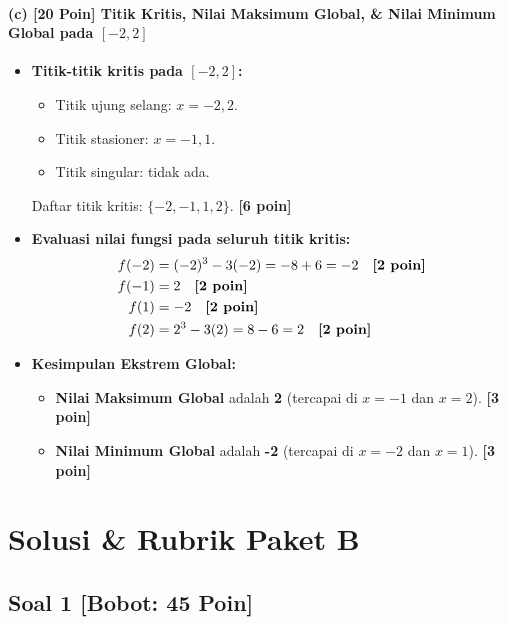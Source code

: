 \documentclass[11pt,a4paper]{article}
\begin{document}
\paragraph{(c) [20 Poin] Titik Kritis, Nilai Maksimum Global, \& Nilai Minimum Global pada $[-2, 2]$}
\begin{itemize}[leftmargin=18pt]
    \item \textbf{Titik-titik kritis pada $[-2, 2]$:}
    \begin{itemize}
        \item Titik ujung selang: $x = -2, 2$.
        \item Titik stasioner: $x = -1, 1$.
        \item Titik singular: tidak ada.
    \end{itemize}
    Daftar titik kritis: $\{-2, -1, 1, 2\}$. \textbf{[6 poin]}
    \item \textbf{Evaluasi nilai fungsi pada seluruh titik kritis:}
    \begin{align*}
        f(-2) &= (-2)^3 - 3(-2) = -8 + 6 = -2 \quad \text{\textbf{[2 poin]}} \\
        f(-1) &= 2 \quad \text{\textbf{[2 poin]}} \\
        f(1)  &= -2 \quad \text{\textbf{[2 poin]}} \\
        f(2)  &= 2^3 - 3(2) = 8 - 6 = 2 \quad \text{\textbf{[2 poin]}}
    \end{align*}
    \item \textbf{Kesimpulan Ekstrem Global:}
    \begin{itemize}
        \item \textbf{Nilai Maksimum Global} adalah \textbf{2} (tercapai di $x = -1$ dan $x = 2$). \textbf{[3 poin]}
        \item \textbf{Nilai Minimum Global} adalah \textbf{-2} (tercapai di $x = -2$ dan $x = 1$). \textbf{[3 poin]}
    \end{itemize}
\end{itemize}

\newpage

\section*{Solusi \& Rubrik Paket B}

\subsection*{Soal 1 [Bobot: 45 Poin]}
\end{document}
